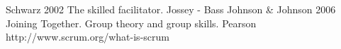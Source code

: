 \begin{thebibliography}{1} %
	Schwarz 2002 The skilled facilitator. Jossey - Bass
	Johnson \& Johnson 2006 Joining Together. Group theory and group skills. Pearson
	http://www.scrum.org/what-is-scrum

\end{thebibliography}